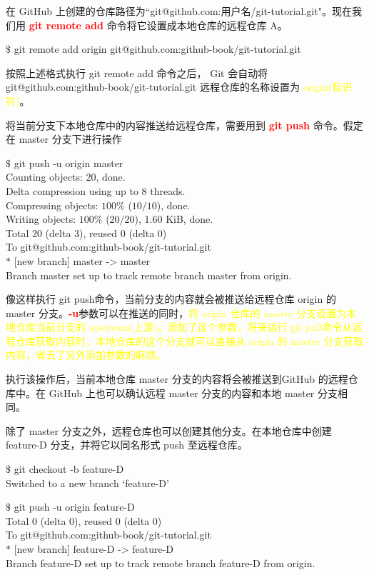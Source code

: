 \documentclass[12pt,a4paper]{article}
\begin{document}
在 GitHub 上创建的仓库路径为``git@github.com:用户名/git-tutorial.git"。现在我们用 \textcolor{red}{\bf git remote add} 命令将它设置成本地仓库的远程仓库 A。
\begin{tcolorbox}[colback=green!5,colframe=green!40!black,title= ]
$\$$ git remote add origin git@github.com:github-book/git-tutorial.git
\end{tcolorbox}
按照上述格式执行 git remote add 命令之后， Git 会自动将 git@github.com:github-book/git-tutorial.git 远程仓库的名称设置为 \textcolor{yellow}{origin(标识符)}。

将当前分支下本地仓库中的内容推送给远程仓库，需要用到 \textcolor{red}{\bf git push} 命令。假定在 master 分支下进行操作
\begin{tcolorbox}[colback=green!5,colframe=green!40!black,title= ]
$\$$ git push -u origin master \\
Counting objects: $20$, done. \\
Delta compression using up to 8 threads. \\
Compressing objects: $100\%$ ($10/10$), done. \\
Writing objects: $100\%$ ($20/20$), 1.60 KiB, done. \\
Total $20$ (delta $3$), reused $0$ (delta $0$) \\
To git@github.com:github-book/git-tutorial.git \\
$\ast$ [new branch] master -> master \\
Branch master set up to track remote branch master from origin.
\end{tcolorbox}
像这样执行 git push命令，当前分支的内容就会被推送给远程仓库 origin 的 master 分支。\textcolor{red}{\bf -u}参数可以在推送的同时，\textcolor{yellow}{将 origin 仓库的 master 分支设置为本地仓库当前分支的 upstream(上游)。添加了这个参数，将来运行 git pull命令从远程仓库获取内容时，本地仓库的这个分支就可以直接从 origin 的 master 分支获取内容，省去了另外添加参数的麻烦。}

执行该操作后，当前本地仓库 master 分支的内容将会被推送到GitHub 的远程仓库中。在 GitHub 上也可以确认远程 master 分支的内容和本地 master 分支相同。

除了 master 分支之外，远程仓库也可以创建其他分支。在本地仓库中创建 feature-D 分支，并将它以同名形式 push 至远程仓库。
\begin{tcolorbox}[colback=green!5,colframe=green!40!black,title= ]
$\$$ git checkout -b feature-D \\
Switched to a new branch `feature-D'
\end{tcolorbox}
\begin{tcolorbox}[colback=green!5,colframe=green!40!black,title= ]
$\$$ git push -u origin feature-D \\
Total 0 (delta 0), reused 0 (delta 0) \\
To git@github.com:github-book/git-tutorial.git \\
$\ast$ [new branch] feature-D -> feature-D \\
Branch feature-D set up to track remote branch feature-D from origin.
\end{tcolorbox}
\end{document}
